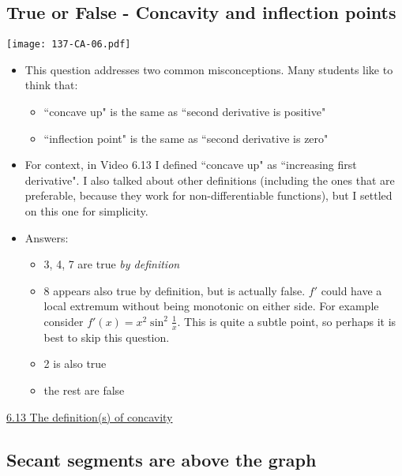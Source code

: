 \documentclass[11pt]{article}
\newcommand{\nl}{\hfill \vspace{-1.1\baselineskip}} %
\newcommand{\vxiii}{\hspace{8mm} \href{https://www.youtube.com/watch?v=4Dh6KdQDRkw&list=PLlwePzQY_wW9EsqbQzPdJTNGsHYvO_2CJ&index=13}{6.13 The definition(s) of concavity}}
\begin{document}
\subsection{True or False - Concavity and inflection points}

\begin{center}
{ \texttt{[image: 137-CA-06.pdf]}}
\end{center}


\begin{comments}
\nl
	\begin{itemize}
		\item  This question addresses two common misconceptions.  Many students like to think that:
			\begin{itemize}
				\item ``concave up" is the same as ``second derivative is positive"
				\item ``inflection point" is the same as ``second derivative is zero"
			\end{itemize}
		\item  For context, in Video 6.13 I defined ``concave up" as ``increasing first derivative".  I also talked about other definitions (including the ones that are preferable, because they work for non-differentiable functions), but I settled on this one for simplicity.
		\item Answers: 
			\begin{itemize}
				\item  3, 4, 7 are true \emph{by definition}
				\item 8 appears also true by definition, but is actually false.  $f'$ could have a local extremum without being monotonic on either side.  For example consider $f'(x) = x^2 \sin^2 \frac{1}{x}$.  This is quite a subtle point, so perhaps it is best to skip this question.
				\item 2 is also true
				\item the rest are false
			\end{itemize}
	\end{itemize}
\end{comments}

\begin{videos}
\vxiii
\end{videos}

\newpage
\subsection{Secant segments are above the graph}
\end{document}
